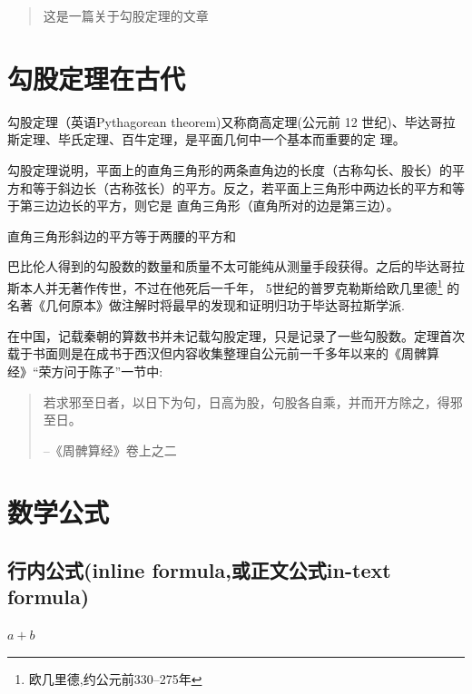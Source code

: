 \documentclass[UTF8]{ctexart}
\author{张三}
\date{\today}
\begin{document}
  \maketitle %
  \begin{abstract}
    这是一篇关于勾股定理的文章
  \end{abstract}
  \tableofcontents %
  \section{勾股定理在古代}
    勾股定理（英语Pythagorean theorem)又称商高定理(公元前 12 世纪)、毕达哥拉斯定理、毕氏定理、百牛定理，是平面几何中一个基本而重要的定 理。%

    勾股定理说明，平面上的直角三角形的两条直角边的长度（古称勾长、股长）的平方和等于斜边长（古称弦长）的平方。反之，若平面上三角形中两边长的平方和等于第三边边长的平方，则它是
    直角三角形（直角所对的边是第三边）。

    \begin{thm}[勾股定理]
      直角三角形斜边的平方等于两腰的平方和
    \end{thm}

    巴比伦人得到的勾股数的数量和质量不太可能纯从测量手段获得。之后的毕达哥拉斯本人并无著作传世，不过在他死后一千年，
    5世纪的普罗克勒斯给欧几里德\footnote{欧几里德,约公元前330--275年}
    的名著《几何原本》做注解时将最早的发现和证明归功于毕达哥拉斯学派.

    在中国，记载秦朝的算数书并未记载勾股定理，只是记录了一些勾股数。定理首次载于书面则是在成书于西汉但内容收集整理自公元前一千多年以来的《周髀算经》“荣方问于陈子”一节中:
    \begin{quote}%
    \kaishu%
      若求邪至日者，以日下为句，日高为股，句股各自乘，并而开方除之，得邪至日。

      --《周髀算经》卷上之二
    \end{quote}

  \section{数学公式}
    \subsection{行内公式(inline formula,或正文公式in-text formula)}
      $a+b$
\end{document}
